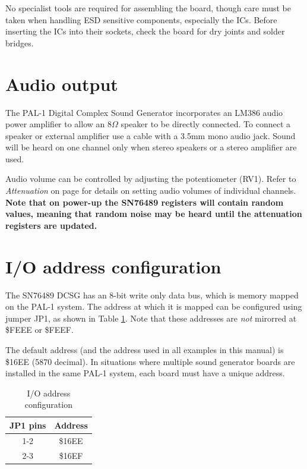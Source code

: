 \documentclass[a4paper,11pt,twoside,openright]{report}
\begin{document}
No specialist tools are required for assembling the board, though care must be taken when handling ESD 
sensitive components, especially the ICs. Before inserting the ICs into their sockets, check the board 
for dry joints and solder bridges. 


\section*{Audio output}
The PAL-1 Digital Complex Sound Generator incorporates an LM386 audio power amplifier to allow an 
$8\Omega$ speaker to be directly connected. To connect a speaker or external amplifier use a cable 
with a 3.5mm mono audio jack. Sound will be heard on one channel only when stereo speakers or
a stereo amplifier are used.   

Audio volume can be controlled by adjusting the potentiometer (RV1). Refer to \textit{Attenuation}
on page \pageref{sec:attenuation} for details on setting audio volumes of individual channels.
\textbf{Note that on power-up the SN76489 registers will contain random values, meaning that random
noise may be heard until the attenuation registers are updated.}

\section*{I/O address configuration}
\label{sec:configuration}
The SN76489 DCSG has an 8-bit write only data bus, which is memory mapped on the PAL-1 system. The   
address at which it is mapped can be configured using jumper JP1, as shown in Table \ref{tab:addresses}.
Note that these addresses are \textit{not} mirorred at \$FEEE or \$FEEF.

The default address (and the address used in all examples in this manual) is \$16EE (5870 decimal). 
In situations where multiple sound generator boards are installed in the same PAL-1 system, each 
board must have a unique address. 

\begin{table}[h]
\centering
\begin{tabular}{c | c}
JP1 pins & Address \\ \hline
1-2 & \$16EE \\
2-3 & \$16EF
\end{tabular}
\caption[]{I/O address configuration}
\label{tab:addresses}
\end{table}
\end{document}
